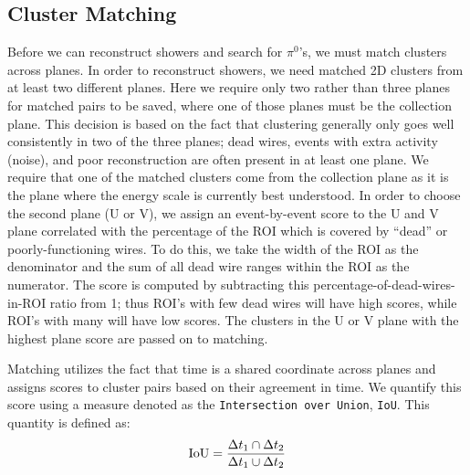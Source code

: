 \subsection{Cluster Matching}
Before we can reconstruct showers and search for $\pi^{0}$'s, we must match clusters across planes.  In order to reconstruct showers, we need matched 2D clusters from at least two different planes. Here we require only two rather than three planes for matched pairs to be saved, where one of those planes must be the collection plane. This decision is based on the fact that clustering generally only goes well consistently in two of the three planes; dead wires, events with extra activity (noise), and poor reconstruction are often present in at least one plane. We require that one of the matched clusters come from the collection plane as it is the plane where the energy scale is currently best understood.  In order to choose the second plane (U or V), we assign an event-by-event score to the U and V plane correlated with the percentage of the ROI which is covered by ``dead'' or poorly-functioning wires.  
 To do this, we take the width of the ROI as the denominator and the sum of all dead wire ranges within the ROI as the numerator. The score is computed by subtracting this percentage-of-dead-wires-in-ROI ratio from 1; thus ROI's with few dead wires will have high scores, while ROI's with many will have low scores.  The clusters in the U or V plane with the highest plane score are passed on to matching. 

\par Matching utilizes the fact that time is a shared coordinate across planes and assigns scores to cluster pairs based on their agreement in time. We quantify this score using a measure denoted as the \texttt{Intersection over Union}, \texttt{IoU}. This quantity is defined as:
\begin{equation}
  {\rm IoU} = \frac{ \Delta t_1 \cap \Delta t_2  }{ \Delta t_1 \cup \Delta t_2 }
\end{equation}


